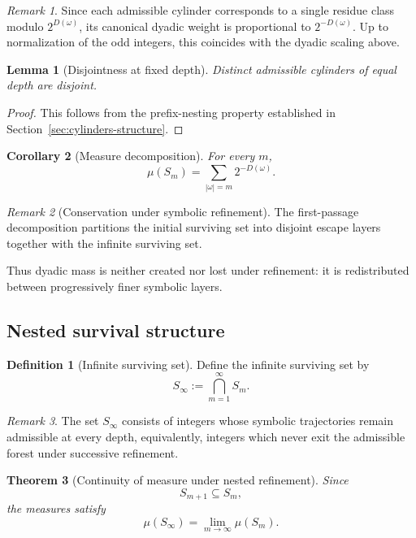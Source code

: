 \documentclass[12pt, oneside]{article}
\numberwithin{equation}{section}
\theoremstyle{definition}
\newtheorem{definition}{Definition}[section]
\theoremstyle{plain}
\newtheorem{theorem}{Theorem}[section]
\newtheorem{lemma}[theorem]{Lemma}
\newtheorem{corollary}[theorem]{Corollary}
\theoremstyle{remark}
\newtheorem*{remark}{Remark}
\begin{document}
\begin{remark}
Since each admissible cylinder corresponds to a single residue class
modulo \(2^{D(\omega)}\), its canonical dyadic weight is proportional
to \(2^{-D(\omega)}\). Up to normalization of the odd integers, this
coincides with the dyadic scaling above.
\end{remark}

\begin{lemma}[Disjointness at fixed depth]
Distinct admissible cylinders of equal depth are disjoint.
\end{lemma}

\begin{proof}
This follows from the prefix-nesting property established in
Section~\ref{sec:cylinders-structure}.
\end{proof}

\begin{corollary}[Measure decomposition]
For every \(m\),
\[
\mu(S_m)
=
\sum_{|\omega|=m}2^{-D(\omega)}.
\]
\end{corollary}

\begin{remark}[Conservation under symbolic refinement]
The first-passage decomposition partitions the initial surviving
set into disjoint escape layers together with the infinite
surviving set.

Thus dyadic mass is neither created nor lost under refinement:
it is redistributed between progressively finer symbolic layers.
\end{remark}

\subsection{Nested survival structure}

\begin{definition}[Infinite surviving set]
Define the infinite surviving set by
\[
S_\infty
:=
\bigcap_{m=1}^{\infty} S_m.
\]
\end{definition}

\begin{remark}
The set \(S_\infty\) consists of integers whose symbolic trajectories
remain admissible at every depth, equivalently, integers which never
exit the admissible forest under successive refinement.
\end{remark}

\begin{theorem}[Continuity of measure under nested refinement]
\label{thm:nested-measure}
Since
\[
S_{m+1}\subseteq S_m,
\]
the measures satisfy
\[
\mu(S_\infty)
=
\lim_{m\to\infty}\mu(S_m).
\]
\end{theorem}
\end{document}
